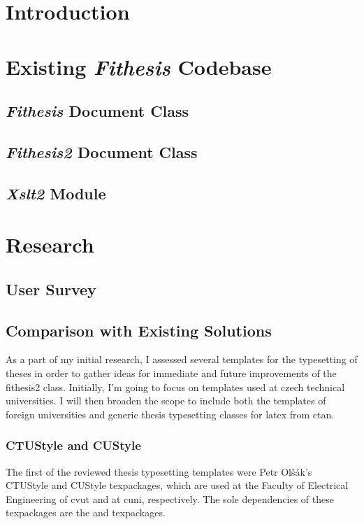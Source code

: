 \documentclass{article}
\begin{document}
  
  \tableofcontents
  \listoftables
  \listoffigures
  \newpage

  \section{Introduction}
  \section{Existing \emph{Fithesis} Codebase}
  \subsection{\emph{Fithesis} Document Class}
  \subsection{\emph{Fithesis2} Document Class}
  \subsection{\emph{Xslt2} Module}
  \section{Research}
  \subsection{User Survey}
  \subsection{Comparison with Existing Solutions}
  As a part of my initial research, I assessed several templates for the typesetting of theses in order to gather ideas for immediate and future improvements of the fithesis2 class. Initially, I'm going to focus on templates used at czech technical universities. I will then broaden the scope to include both the templates of foreign universities and generic thesis typesetting classes for \gls{latex} from \gls{ctan}.

  \subsubsection{CTUStyle and CUStyle}
  The first of the reviewed thesis typesetting templates were Petr Olšák's CTUStyle \cite{ctustyle} and CUStyle \cite{custyle} \glspl{texpackage}, which are used at the Faculty of Electrical Engineering of \gls{cvut} and at \gls{cuni}, respectively. The sole dependencies of these \glspl{texpackage} are the  and  \glspl{texpackage}.
\end{document}
